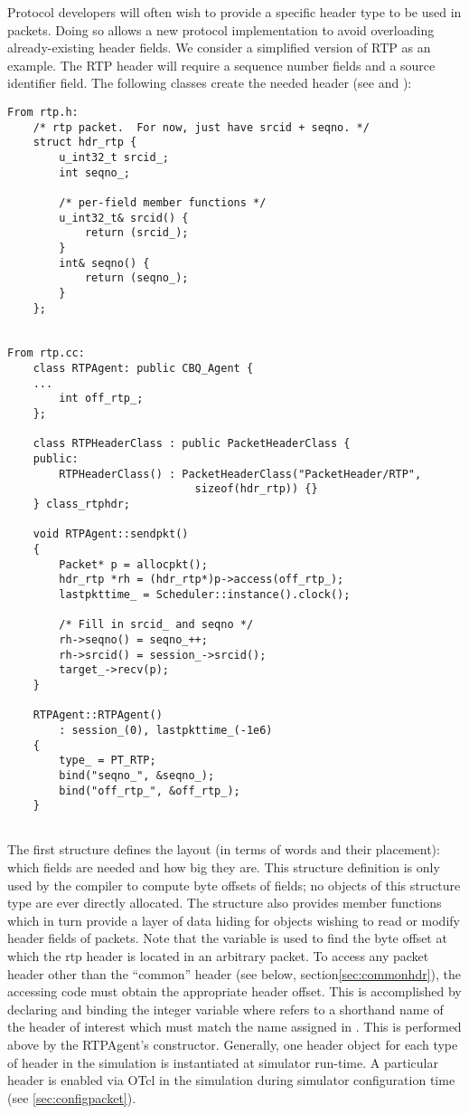 Protocol developers
will often wish to provide a specific header type to be used in packets.
Doing so allows a new protocol implementation
to avoid overloading already-existing header fields.
We consider a simplified version of RTP as an example.
The RTP header will require a sequence number fields and a source
identifier field.
The following classes create the needed header
(see  and ):
\begin{small}
\begin{verbatim}
From rtp.h:
	/* rtp packet.  For now, just have srcid + seqno. */
	struct hdr_rtp { 
		u_int32_t srcid_;
		int seqno_;

		/* per-field member functions */
		u_int32_t& srcid() {
			return (srcid_);
		}
		int& seqno() {
			return (seqno_);
		}
	};   


From rtp.cc:
	class RTPAgent: public CBQ_Agent {
	...
		int off_rtp_;
	};

	class RTPHeaderClass : public PacketHeaderClass {
	public: 
		RTPHeaderClass() : PacketHeaderClass("PacketHeader/RTP",
						     sizeof(hdr_rtp)) {}
	} class_rtphdr;

	void RTPAgent::sendpkt()
	{
		Packet* p = allocpkt();
		hdr_rtp *rh = (hdr_rtp*)p->access(off_rtp_);
		lastpkttime_ = Scheduler::instance().clock();

		/* Fill in srcid_ and seqno */
		rh->seqno() = seqno_++;
		rh->srcid() = session_->srcid();
		target_->recv(p);
	}

	RTPAgent::RTPAgent()
		: session_(0), lastpkttime_(-1e6)
	{
		type_ = PT_RTP;
		bind("seqno_", &seqno_);
		bind("off_rtp_", &off_rtp_);
	}


\end{verbatim}
\end{small}
The first structure defines the layout (in terms of words and their
placement): which fields are needed and how big they are.
This structure definition is only used by the
compiler to compute byte offsets of fields;
no objects of this structure type are ever directly allocated.
The structure also provides member functions
which in turn
provide a layer of data hiding for objects wishing to read
or modify header fields of packets.
Note that the variable  is used
to find the byte offset at which the rtp header is located
in an arbitrary packet.
To access any packet header other than the ``common'' header
(see below, section\ref{sec:commonhdr}), the accessing code
must obtain the appropriate header offset.
This is accomplished by declaring and binding
the integer variable 
where  refers to a shorthand name
of the header of interest which must match the
name assigned in .
This is performed above by the RTPAgent's constructor.
Generally, one header object for each type of header
in the simulation is instantiated at simulator run-time.
A particular header is enabled via OTcl in the simulation during
simulator configuration time (see \ref{sec:configpacket}).

